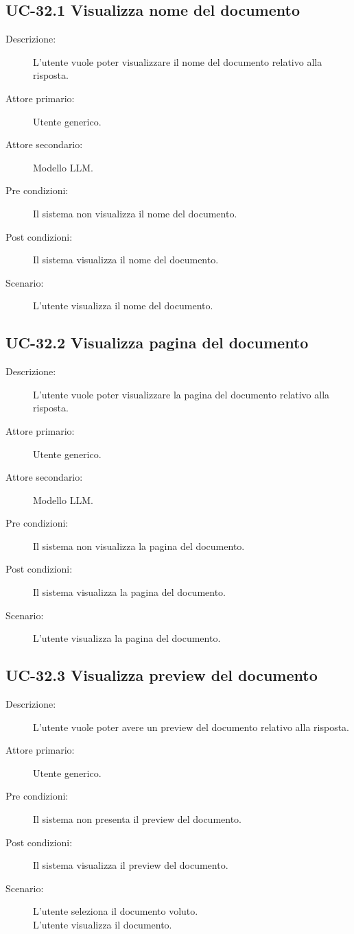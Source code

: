 \subsection{UC-32.1 Visualizza nome del documento}
\begin{description}
    \item[Descrizione:] L'utente vuole poter visualizzare il nome del documento relativo alla risposta.
    \item[Attore primario:] Utente generico.
    \item[Attore secondario:] Modello LLM.
    \item[Pre condizioni:] Il sistema non visualizza il nome del documento.
    \item[Post condizioni:] Il sistema visualizza il nome del documento.
    \item[Scenario:] L'utente visualizza il nome del documento.
\end{description}

\subsection{UC-32.2 Visualizza pagina del documento}
\begin{description}
    \item[Descrizione:] L'utente vuole poter visualizzare la pagina del documento relativo alla risposta.
    \item[Attore primario:] Utente generico.
    \item[Attore secondario:] Modello LLM.
    \item[Pre condizioni:] Il sistema non visualizza la pagina del documento.
    \item[Post condizioni:] Il sistema visualizza la pagina del documento.
    \item[Scenario:] L'utente visualizza la pagina del documento.
\end{description}

\subsection{UC-32.3 Visualizza preview del documento}
\begin{description}
    \item[Descrizione:] L'utente vuole poter avere un preview del documento relativo alla risposta.
    \item[Attore primario:] Utente generico.
    \item[Pre condizioni:] Il sistema non presenta il preview del documento.
    \item[Post condizioni:] Il sistema visualizza il preview del documento.
    \item[Scenario:] L'utente seleziona il documento voluto. \\L'utente visualizza il documento.
\end{description}

